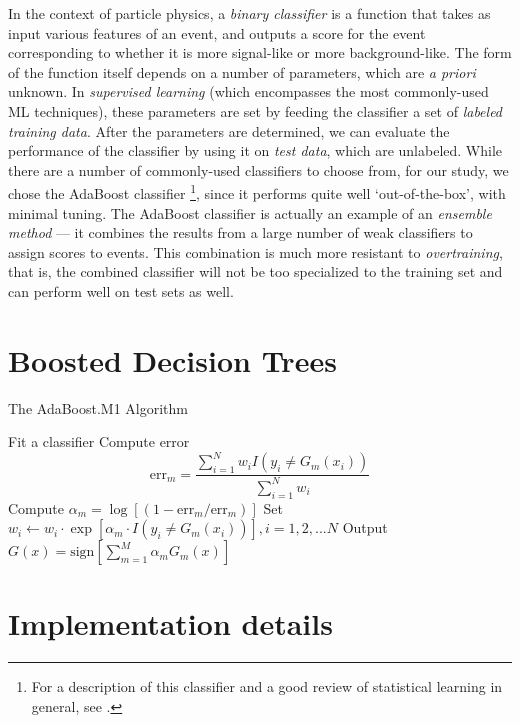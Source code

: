 In the context of particle physics, a \emph{binary classifier} is a function that takes as input various features of an event, and outputs a score for the event corresponding to whether it is more signal-like or more background-like. The form of the function itself depends on a number of parameters, which are \emph{a priori} unknown. In \emph{supervised learning} (which encompasses the most commonly-used ML techniques), these parameters are set by feeding the classifier a set of \emph{labeled training data}. After the parameters are determined, we can evaluate the performance of the classifier by using it on \emph{test data}, which are unlabeled. While there are a number of commonly-used classifiers to choose from, for our study, we chose the AdaBoost classifier \footnote{For a description of this classifier and a good review of statistical learning in general, see \citep{Hastie2011}.}, since it performs quite well `out-of-the-box', with minimal tuning. The AdaBoost classifier is actually an example of an \emph{ensemble method} --- it combines the results from a large number of weak classifiers to assign scores to events. This combination is much more resistant to \emph{overtraining}, that is, the combined classifier will not be too specialized to the training set and can perform well on test sets as well.


\section{Boosted Decision Trees}

\begin{algorithm}
\caption{The AdaBoost.M1 Algorithm}\label{adaboost}
\begin{algorithmic}[0]
\State Fit a classifier
\State Compute error 
\[\text{err}_m = \frac{\sum_{i = 1}^N w_i I(y_i\neq G_m(x_i))}{\sum_{i=1}^N w_i}\]
\State Compute $\alpha_m = \log[(1-\text{err}_m/\text{err}_m)]$
\State Set $w_i\gets w_i\cdot \exp[\alpha_m\cdot I(y_i\neq G_m(x_i))], i = 1,2,...N$
\EndFor
\State Output $G(x) = \text{sign}\left[\sum_{m=1}^M\alpha_mG_m(x)\right]$
\end{algorithmic}
\end{algorithm}

\section{Implementation details}
